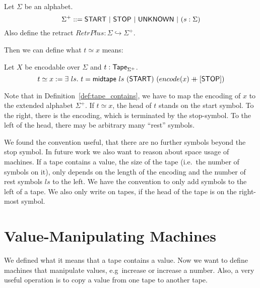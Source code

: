 \begin{definition}[$\Sigma^+$] Let $\Sigma$ be an alphabet.
  \[
    \Sigma^+ ::= \textsf{START} ~|~ \textsf{STOP} ~|~ \textsf{UNKNOWN} ~|~ (s: \Sigma)
  \]
  Also define the retract $RetrPlus : \Sigma \hookrightarrow \Sigma^+$.
\end{definition}

Then we can define what $t \simeq x$ means:

\begin{definition}[$t \simeq x$]
  \label{def:tape_contains}
  Let $X$ be encodable over $\Sigma$ and $t : \textsf{Tape}_{\Sigma^+}$.
  \[
    t \simeq x := \exists~ls.~
    t = \textsf{midtape}~ls~(\textsf{START})~(encode(x) \mathbin{+\mkern-10mu+} [\textsf{STOP}])
  \]
\end{definition}

Note that in Definition~\ref{def:tape_contains}, we have to map the encoding of $x$ to the extended alphabet $\Sigma^+$.  If $t \simeq x$, the head of
$t$ stands on the start symbol.  To the right, there is the encoding, which is terminated by the stop-symbol.  To the left of the head, there may be
arbitrary many ``rest'' symbols.

We found the convention useful, that there are no further symbols beyond the stop symbol.  In future work we also want to reason about space usage of
machines.  If a tape contains a value, the size of the tape (i.e.\ the number of symbols on it), only depends on the length of the encoding and the
number of rest symbols $ls$ to the left.  We have the convention to only add symbols to the left of a tape.  We also only write on tapes, if the head
of the tape is on the right-most symbol.

\section{Value-Manipulating Machines}
\label{sec:value-manipulate}


We defined what it means that a tape contains a value.  Now we want to define machines that manipulate values, e.g\ increase or increase a number.
Also, a very useful operation is to copy a value from one tape to another tape.


\todo{}







